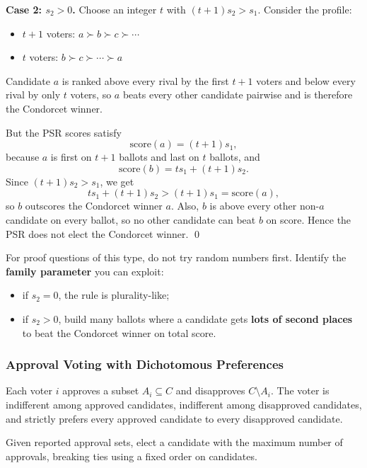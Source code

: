 \textbf{Case 2: $s_2 > 0$.} Choose an integer $t$ with $(t+1)s_2 > s_1$. Consider the profile:
\begin{itemize}
  \item $t+1$ voters: $a \succ b \succ c \succ \cdots$
  \item $t$ voters: $b \succ c \succ \cdots \succ a$
\end{itemize}
Candidate $a$ is ranked above every rival by the first $t+1$ voters and below every rival by only $t$ voters, so $a$ beats every other candidate pairwise and is therefore the Condorcet winner.

But the PSR scores satisfy
\[
  \text{score}(a) = (t+1)s_1,
\]
because $a$ is first on $t+1$ ballots and last on $t$ ballots, and
\[
  \text{score}(b) = ts_1 + (t+1)s_2.
\]
Since $(t+1)s_2 > s_1$, we get
\[
  ts_1 + (t+1)s_2 > (t+1)s_1 = \text{score}(a),
\]
so $b$ outscores the Condorcet winner $a$. Also, $b$ is above every other non-$a$ candidate on every ballot, so no other candidate can beat $b$ on score. Hence the PSR does not elect the Condorcet winner. \qed

\begin{tipbox}
For proof questions of this type, do not try random numbers first. Identify the \textbf{family parameter} you can exploit:
\begin{itemize}
  \item if $s_2=0$, the rule is plurality-like;
  \item if $s_2>0$, build many ballots where a candidate gets \textbf{lots of second places} to beat the Condorcet winner on total score.
\end{itemize}
\end{tipbox}

\separator

\subsubsection{Approval Voting with Dichotomous Preferences}

\begin{defbox}
Each voter $i$ approves a subset $A_i \subseteq C$ and disapproves $C \setminus A_i$. The voter is indifferent among approved candidates, indifferent among disapproved candidates, and strictly prefers every approved candidate to every disapproved candidate.
\end{defbox}

\begin{defbox}
Given reported approval sets, elect a candidate with the maximum number of approvals, breaking ties using a fixed order on candidates.
\end{defbox}

